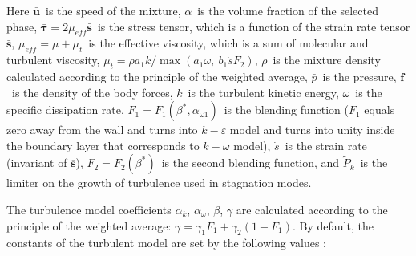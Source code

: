 \documentclass[applsci,article,submit,moreauthors,pdftex]{Definitions/mdpi}
\begin{document}
Here $\bar{\boldsymbol{u}}$~is the speed of the mixture, $\alpha$~is the volume fraction of the selected phase, $\bar{\boldsymbol{\tau}} = 2 \mu_{eff} \bar{\boldsymbol{s}}$~is the stress tensor, which is a function of the strain rate tensor $\bar{\boldsymbol{s}}$, $\mu_{eff} = \mu + \mu_t$~is the effective viscosity, which is a sum of molecular and turbulent viscosity, $\mu_t = \rho a_1 k / \max(a_1 \omega, \ b_1 \dot{s} F_2)$, $\rho$~is the mixture density calculated according to the principle of the weighted average, $\bar{p}$~is the pressure, $\bar{\boldsymbol{f}}$~is the density of the body forces, $k$~is the turbulent kinetic energy, $\omega$~is the specific dissipation rate, $F_1 = F_1(\beta^*, \alpha_{\omega 1})$~is the blending function ($F_1$ equals zero away from the wall and turns into $k-\varepsilon$ model and turns into unity inside the boundary layer that corresponds to $k-\omega$ model), $\dot{s}$~is the strain rate (invariant of $\overline{\boldsymbol{s}}$), $F_2 = F_2(\beta^*)$~is the second blending function, and $\widetilde{P}_k$~is the limiter on the growth of turbulence used in stagnation modes.

The turbulence model coefficients $\alpha_k$, $\alpha_\omega$, $\beta$, $\gamma$ are calculated according to the principle of the weighted average: $\gamma = \gamma_1 F_1 + \gamma_2 (1 - F_1)$. By default, the constants of the turbulent model are set by the following values \cite{LaunderSpalding1974, Tahry1983, LaunderMorseRodiSpaldiug1972}:
\end{document}
